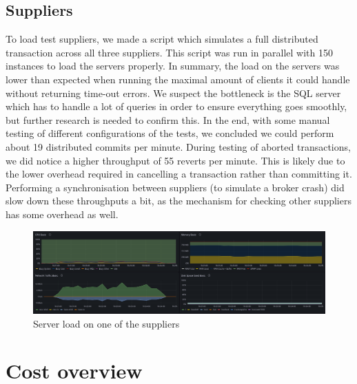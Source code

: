 \documentclass[10pt,a4paper,kul]{kulakarticle} %
\begin{document}
		\subsection{Suppliers}
			To load test suppliers, we made a script which simulates a full distributed transaction across all three suppliers. This script was run in parallel with 150 instances to load the servers properly. In summary, the load on the servers was lower than expected when running the maximal amount of clients it could handle without returning time-out errors. We suspect the bottleneck is the SQL server which has to handle a lot of queries in order to ensure everything goes smoothly, but further research is needed to confirm this. In the end, with some manual testing of different configurations of the tests, we concluded we could perform about 19 distributed commits per minute. During testing of aborted transactions, we did notice a higher throughput of 55 reverts per minute. This is likely due to the lower overhead required in cancelling a transaction rather than committing it. Performing a synchronisation between suppliers (to simulate a broker crash) did slow down these throughputs a bit, as the mechanism for checking other suppliers has some overhead as well. 
			\begin{figure}[h!]
				\centering
				\includegraphics[width=0.9\linewidth]{images/supplier-load}
				\caption{Server load on one of the suppliers}
				\label{fig:supplier_load}
			\end{figure}
			

	\section{Cost overview}
\end{document}
